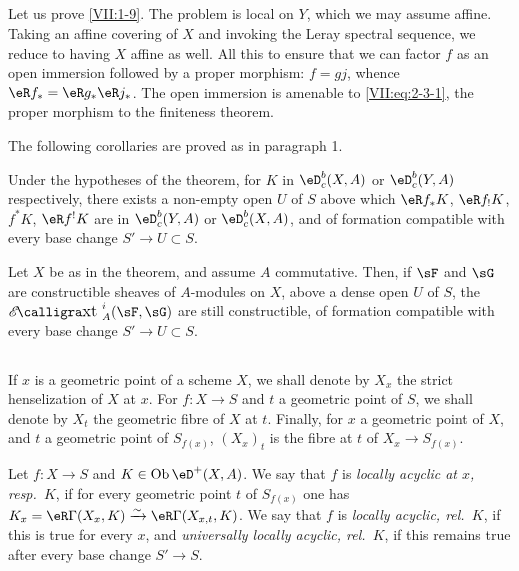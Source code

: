 \subsection{}\label{VII:2-8}

Let us prove \ref{VII:1-9}. The problem is local on $Y$, which we may assume
affine. Taking an affine covering of $X$ and invoking the Leray spectral
sequence, we reduce to having $X$ affine as well. All this to
ensure that we can factor $f$ as an open immersion followed by a
proper morphism: $f=g j$, whence $\eR f_\ast = \eR g_\ast \eR j_\ast$. The
open immersion is amenable to \eqref{VII:eq:2-3-1}, the proper morphism
to the finiteness theorem.

The following corollaries are proved as in paragraph 1.




\begin{corollary_}\label{VII:2-9}
Under the hypotheses of the theorem, for $K$ in $\eD_c^b(X,A)$ or
$\eD_c^b(Y,A)$ respectively, there exists a non-empty open $U$ of $S$
above which $\eR f_\ast K$, $\eR f_! K$, $f^\ast K$, $\eR f^! K$ are
in $\eD_c^b(Y,A)$ or $\eD_c^b(X,A)$, and of formation compatible with every
base change $S' \to U\subset S$.
\end{corollary_}




\begin{corollary_}\label{VII:2-10}
Let $X$ be as in the theorem, and assume $A$ commutative. Then, if
$\sF$ and $\sG$ are constructible sheaves of $A$-modules on $X$,
above a dense open $U$ of $S$, the $\Ext_A^i(\sF,\sG)$ are still
constructible, of formation compatible with every base change
$S' \to U\subset S$.
\end{corollary_}




\subsection{}\label{VII:2-11}

If $x$ is a geometric point of a scheme $X$, we shall denote by $X_x$
the strict henselization of $X$ at $x$. For $f:X\to S$ and $t$ a
geometric point of $S$, we shall denote by $X_t$ the geometric fibre of $X$ at
$t$. Finally, for $x$ a geometric point of $X$, and $t$ a geometric
point of $S_{f(x)}$, $(X_x)_t$ is the fibre at $t$ of
$X_x \to S_{f(x)}$.




\begin{definition_}\label{VII:2-12}
Let $f:X\to S$ and $K\in \ob\eD^+(X,A)$. We say that $f$ is \emph{locally
acyclic at $x$, resp.\ $K$}, if for every geometric point $t$ of
$S_{f(x)}$ one has $K_x=\eR\Gamma(X_x,K)\iso \eR\Gamma(X_{x,t},K)$. We say that $f$
is \emph{locally acyclic, rel.\ $K$}, if this is true for every $x$, and
\emph{universally locally acyclic, rel.\ $K$}, if this remains true
after every base change $S' \to S$.
\end{definition_}




